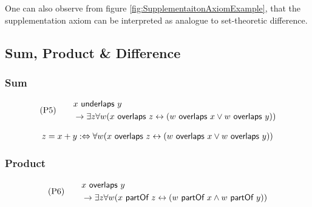 

One can also observe from figure \ref{fig:SupplementaitonAxiomExample}, that the supplementation axiom can be interpreted as analogue to set-theoretic difference.

\subsection{Sum, Product \& Difference}
\label{subsection:Sum}
\subsubsection{Sum}
\begin{align}
&\text{(P5)}
\quad
&\begin{split}
&x ~\textsf{underlaps}~ y 
\\&\rightarrow
\exists z \forall w (x ~\textsf{overlaps}~ z \leftrightarrow (w ~\textsf{overlaps}~ x \vee w ~\textsf{overlaps}~ y))
\end{split}
\end{align}

\begin{align}
z = x + y
:\Leftrightarrow
\forall w (x ~\textsf{overlaps}~ z \leftrightarrow (w ~\textsf{overlaps}~ x \vee w ~\textsf{overlaps}~ y))
\end{align}

\subsubsection{Product}
\begin{align}
&\text{(P6)}
\quad
&\begin{split}
&x ~\textsf{overlaps}~ y 
\\&\rightarrow
\exists z \forall w (x ~\textsf{partOf}~ z \leftrightarrow (w ~\textsf{partOf}~ x \wedge w ~\textsf{partOf}~ y))
\end{split}
\end{align}

